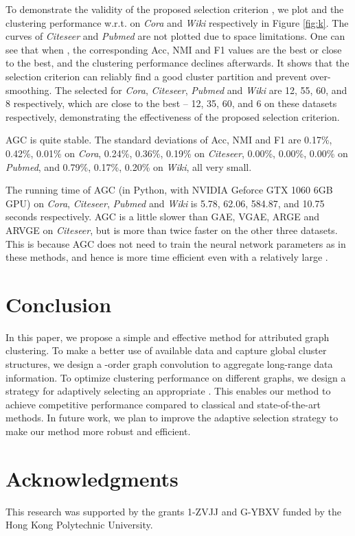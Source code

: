\documentclass{article}
\begin{document}
To demonstrate the validity of the proposed selection criterion , we plot  and the clustering performance w.r.t.  on \emph{Cora} and \emph{Wiki} respectively in Figure \ref{fig:k}. The curves of \emph{Citeseer} and \emph{Pubmed} are not plotted due to space limitations. One can see that when , the corresponding Acc, NMI and F1 values are the best or close to the best, and the clustering performance declines afterwards. It shows that the selection criterion can reliably find a good cluster partition and prevent over-smoothing. The selected  for \emph{Cora}, \emph{Citeseer}, \emph{Pubmed} and \emph{Wiki} are 12, 55, 60, and 8 respectively, which are close to the best  -- 12, 35, 60, and 6 on these datasets respectively, demonstrating the effectiveness of the proposed selection criterion.

AGC is quite stable. The standard deviations of Acc, NMI and F1 are 0.17\%, 0.42\%, 0.01\% on \emph{Cora}, 0.24\%, 0.36\%, 0.19\% on \emph{Citeseer}, 0.00\%, 0.00\%, 0.00\% on \emph{Pubmed}, and 0.79\%, 0.17\%, 0.20\% on \emph{Wiki}, all very small.


The running time of AGC (in Python, with NVIDIA Geforce GTX 1060 6GB GPU) on \emph{Cora}, \emph{Citeseer}, \emph{Pubmed} and \emph{Wiki} is 5.78, 62.06, 584.87, and 10.75 seconds respectively. AGC is a little slower than GAE, VGAE, ARGE and ARVGE on \emph{Citeseer}, but is more than twice faster on the other three datasets. This is because AGC does not need to train the neural network parameters as in these methods, and hence is more time efficient even with a relatively large . 


 

\section{Conclusion}

In this paper, we propose a simple and effective method for attributed graph clustering. To make a better use of available data and capture global cluster structures, we design a -order graph convolution to aggregate long-range data information. To optimize clustering performance on different graphs, we design a strategy for adaptively selecting an appropriate . This enables our method to achieve competitive performance compared to classical and state-of-the-art methods.
In future work, we plan to improve the adaptive selection strategy to make our method more robust and efficient.

 \section*{Acknowledgments}

This research was supported by the grants 1-ZVJJ and G-YBXV funded by the Hong Kong Polytechnic University.
 










\end{document}
